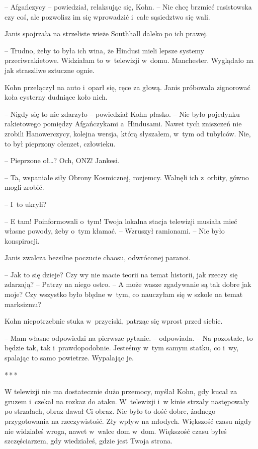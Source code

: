 \documentclass[oneside,polish,11pt,sfheadings]{mwbk}
\newcommand{\threeast}{\bigskip\par\centerline{*\,*\,*}\medskip\par}%
\begin{document}
-- Afgańczycy -- powiedział, relaksując się, Kohn. -- Nie chcę brzmieć
rasistowska czy coś, ale pozwolisz im się wprowadzić i~całe sąsiedztwo
się wali.

Janis spojrzała na strzeliste wieże Southhall daleko po ich prawej.

-- Trudno, żeby to była ich wina, że Hindusi mieli lepsze systemy
przeciwrakietowe. Widziałam to w~telewizji w~domu. Manchester. Wyglądało
na jak straszliwe sztuczne ognie.

Kohn przełączył na auto i~oparł się, ręce za głową. Janis próbowała
zignorować koła cysterny dudniące koło nich.

-- Nigdy się to nie zdarzyło -- powiedział Kohn płasko. -- Nie było
pojedynku rakietowego pomiędzy Afgańczykami a~Hindusami. Nawet tych
zniszczeń nie zrobili Hanowerczycy, kolejna wersja, którą słyszałem, w~tym od tubylców. Nie, to był pieprzony ołenzet, człowieku.

-- Pieprzone oł\ldots? Och, ONZ! Jankesi.

-- Ta, wspaniałe siły Obrony Kosmicznej, rozjemcy. Walnęli ich z~orbity,
gówno mogli zrobić.

-- I~to ukryli?

-- E tam! Poinformowali o~tym! Twoja lokalna stacja telewizji musiała
mieć własne powody, żeby o~tym kłamać. -- Wzruszył ramionami. -- Nie było
konspiracji.

Janis zwalcza bezsilne poczucie chaosu, odwróconej paranoi.

-- Jak to się dzieje? Czy wy nie macie teorii na temat historii, jak
rzeczy się zdarzają? -- Patrzy na niego ostro. -- A może wasze zgadywanie
są tak dobre jak moje? Czy wszystko było błędne w~tym, co nauczyłam się
w szkole na temat marksizmu?

Kohn niepotrzebnie stuka w~przyciski, patrząc się wprost przed siebie.

-- Mam własne odpowiedzi na pierwsze pytanie. -- odpowiada. -- Na
pozostałe, to będzie tak, tak i~prawdopodobnie. Jesteśmy w~tym samym
statku, co i~wy, spalając to samo powietrze. Wypalając je.
  \threeast 

W telewizji nie ma dostatecznie dużo przemocy, myślał Kohn, gdy kucał za
gruzem i~czekał na rozkaz do ataku. W~telewizji i~w kinie strzały
następowały po strzałach, obraz dawał Ci obraz. Nie było to dość dobre,
żadnego przygotowania na rzeczywistość. Zły wpływ na młodych. Większość
czasu nigdy nie widziałeś wroga, nawet w~walce dom w~dom. Większość
czasu byłeś szczęściarzem, gdy wiedziałeś, gdzie jest Twoja strona.
\end{document}
